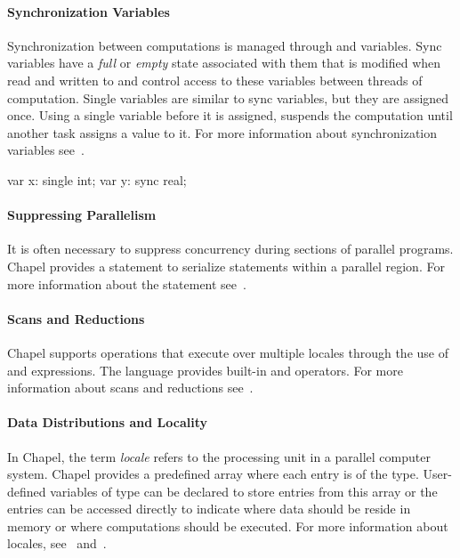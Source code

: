 \paragraph{Synchronization Variables}
Synchronization between computations is managed through 
and  variables.  Sync variables have a {\em full} or {\em
empty} state associated with them that is modified when read and
written to and control access to these variables between threads of
computation.  Single variables are similar to sync variables, but they
are assigned once.  Using a single variable before it is assigned,
suspends the computation until another task assigns a value to it.
For more information about synchronization variables
see~.
\begin{chapel}
var x: single int;
var y: sync real;
\end{chapel}

\paragraph{Suppressing Parallelism}
It is often necessary to suppress concurrency during sections of
parallel programs.  Chapel provides a  statement to
serialize statements within a parallel region.  For more information
about the  statement see~.


\paragraph{Scans and Reductions}
Chapel supports operations that execute over multiple locales through
the use of  and  expressions.  The language
provides built-in  and  operators.  For more
information about scans and reductions see~.

\paragraph{Data Distributions and Locality}

In Chapel, the term {\em locale} refers to the processing unit in a
parallel computer system.  Chapel provides a predefined
array  where each entry is of the  type.
User-defined variables of  type can be declared to store
entries from this  array or the entries can be accessed
directly to indicate where data should be reside in memory or where
computations should be executed.  For more information about locales,
see~ and~.

